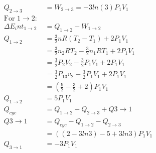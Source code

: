 \begin{align*}
	Q_{2\to3}&=W_{2\to3}=-3ln(3)P_1V_1\\
	\text{For }1\to2 \text{: }\\
	\Delta E_int_{1\to2} &= Q_{1\to2}-W_{1\to2}\\
	Q_{1\to2}&=\frac{3}{2}nR(T_2-T_1)+2P_1V_1\\
	&=\frac{3}{2}n_2RT_2-\frac{3}{2}n_1RT_1+2P_1V_1\\
	&=\frac{3}{2}P_2V_2-\frac{3}{2}P_1V_1+2P_1V_1\\
	&=\frac{3}{2}P_13v_2-\frac{3}{2}P_1V_1+2P_1V_1\\
	&= \left(\frac{9}{2}-\frac{3}{2}+2\right)P_1V_1\\
	Q_{1\to2}&=5P_1V_1\\
	Q_{cyc}&=Q_{1\to2}+Q_{2\to3}+Q{3\to1}\\
	Q{3\to1}&=Q_{cyc}-Q_{1\to2}-Q_{2\to3}\\
	&=((2-3ln3)-5+3ln3)P_1V_1\\
	Q_{3\to1}&=-3P_1V_1
	\end{align*}


